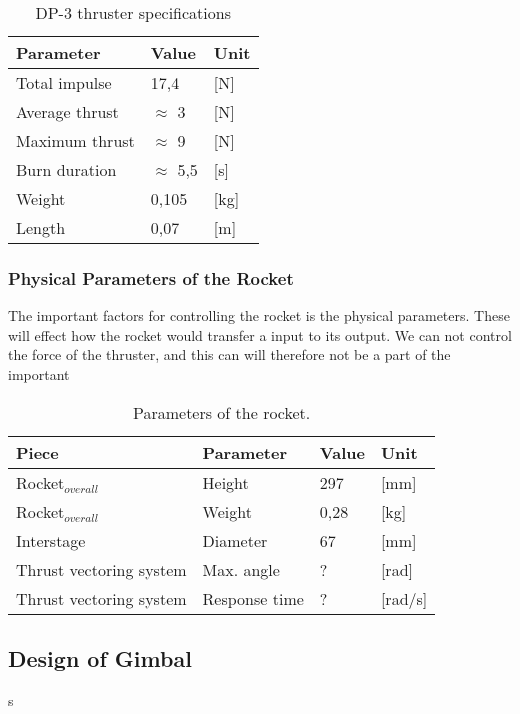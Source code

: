 \begin{table}[]
\centering
\begin{tabular}{lll}
\hline
Parameter      & Value         & Unit \\ \hline
Total impulse  & 17,4          & [N]  \\
Average thrust & $\approx$ 3   & [N]  \\
Maximum thrust & $\approx$ 9 & [N]  \\
Burn duration  & $\approx$ 5,5 & [s]  \\
Weight         & 0,105         & [kg] \\
Length         & 0,07          & [m] 
\end{tabular}
\caption{DP-3 thruster specifications}
\label{ThrusterValue}
\end{table}
                

\subsubsection*{Physical Parameters of the Rocket}
The important factors for controlling the rocket is the physical parameters. These will effect how the rocket would transfer a input to its output. We can not control the force of the thruster, and this can will therefore not be a part of the important   		
\begin{table}[htbp]
	\centering
	\begin{tabular}{llll}
	\hline
	Piece & Parameter & Value & Unit \\ \hline
	Rocket$_{overall}$ & Height & 297 & {[}mm{]} \\
	Rocket$_{overall}$ & Weight & 0,28 & {[}kg{]} \\
	Interstage & Diameter & 67 & {[}mm{]} \\
	Thrust vectoring system & Max. angle & ? & {[}rad{]}\\
	Thrust vectoring system & Response time & ? & {[}rad/s{]}
	\end{tabular}
\caption{Parameters of the rocket.}
\label{Rocket_measurements}
\end{table}

\startexplain
{}
\stopexplain

\subsection{Design of Gimbal}
s


